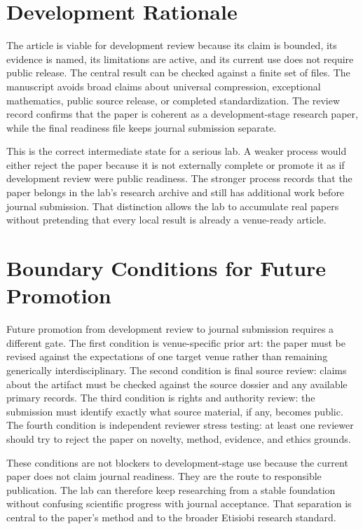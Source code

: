 \documentclass[sigconf,nonacm]{acmart}
\begin{document}
\section{Development Rationale}
The article is viable for development review because its claim is bounded, its
evidence is named, its limitations are active, and its current use does not
require public release. The central result can be checked against a finite set
of files. The manuscript avoids broad claims about universal compression,
exceptional mathematics, public source release, or completed standardization.
The review record confirms that the paper is coherent as a development-stage
research paper, while the final readiness file keeps journal submission
separate.

This is the correct intermediate state for a serious lab. A weaker process would
either reject the paper because it is not externally complete or promote it as if
development review were public readiness. The stronger process records that the
paper belongs in the lab's research archive and still has additional work before
journal submission. That distinction allows the lab to accumulate real papers
without pretending that every local result is already a venue-ready
article.

\section{Boundary Conditions for Future Promotion}
Future promotion from development review to journal submission requires a
different gate. The first condition is venue-specific prior art: the paper must
be revised against the expectations of one target venue rather than remaining
generically interdisciplinary. The second condition is final source review:
claims about the artifact must be checked against the source dossier and any
available primary records. The third condition is rights and authority review:
the submission must identify exactly what source material, if any, becomes
public. The fourth condition is independent reviewer stress testing: at least one
reviewer should try to reject the paper on novelty, method, evidence, and ethics
grounds.

These conditions are not blockers to development-stage use because the current
paper does not claim journal readiness. They are the route to responsible
publication. The lab can therefore keep researching from a stable foundation
without confusing scientific progress with journal acceptance. That separation
is central to the paper's method and to the broader Etisiobi research standard.
\end{document}
